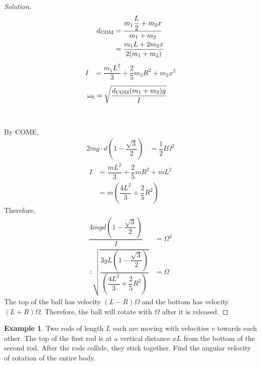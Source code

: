 \documentclass[fleqn, a4paper, 12pt]{article}
\theoremstyle{definition}
\newtheorem{example}{Example}
\theoremstyle{theorem}
\newenvironment{solution}
{\begin{proof}[Solution]\let\qed\relax}
	{\end{proof}}
\begin{document}
\begin{solution}
	\begin{align*}
		d_{\textnormal{COM}} &= \dfrac{m_1 \dfrac{L}{2} + m_2 x}{m_1 + m_2}\\
		&= \dfrac{m_1 L + 2 m_2 x}{2 (m_1 + m_2)}
	\end{align*}
	\begin{align*}
		I &= \dfrac{m_1 L^2}{3} + \dfrac{2}{5} m_2 R^2 + m_2 x^2
	\end{align*}
	\begin{align*}
		\omega_0 &= \sqrt{\dfrac{d_{\textnormal{COM}} (m_1 + m_2) g}{I}}
	\end{align*}
	~\\
	~\\
	By COME,
	\begin{align*}
		2 m g \cdot d \left( 1 - \dfrac{\sqrt{3}}{2} \right) &= \dfrac{1}{2} I \Omega^2
	\end{align*}
	\begin{align*}
		I &= \dfrac{m L^2}{3} + \dfrac{2}{5} m R^2 + m L^2\\
		&= m \left( \dfrac{4 L^2}{3} + \dfrac{2}{5} R^2 \right)
	\end{align*}
	Therefore,
	\begin{align*}
		\dfrac{4 m g d \left( 1 - \dfrac{\sqrt{3}}{2} \right)}{I} &= \Omega^2\\
		\therefore \sqrt{\dfrac{3 g L \left( 1 - \dfrac{\sqrt{3}}{2} \right)}{\left( \dfrac{4 L^2}{3} + \dfrac{2}{5} R^2 \right)}} &= \Omega
	\end{align*}
	The top of the ball has velocity $(L - R) \Omega$ and the bottom has velocity $(L + R) \Omega$. Therefore, the ball will rotate with $\Omega$ after it is released.
\end{solution}

\begin{example}
	Two rods of length $L$ each are moving with velocities $v$ towards each other. The top of the first rod is at a vertical distance $x L$ from the bottom of the second rod. After the rods collide, they stick together. Find the angular velocity of rotation of the entire body.\\
\end{example}
\end{document}
